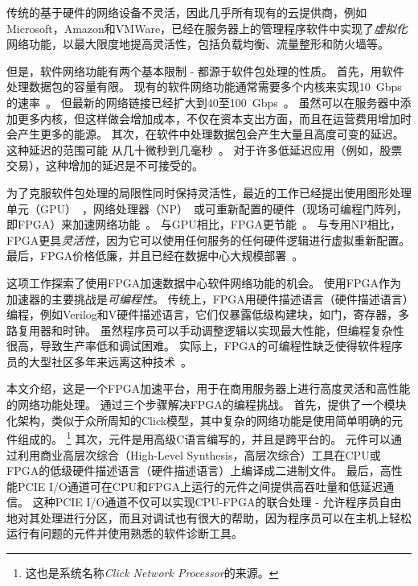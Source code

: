 传统的基于硬件的网络设备不灵活，因此几乎所有现有的云提供商，例如Microsoft，Amazon和VMWare，已经在服务器上的管理程序软件中实现了\textit{虚拟化}网络功能，以最大限度地提高灵活性，包括负载均衡、流量整形和防火墙等。

但是，软件网络功能有两个基本限制 - 都源于软件包处理的性质。
首先，用软件处理数据包的容量有限。
现有的软件网络功能通常需要多个内核来实现10~Gbps的速率~\cite{comb,martins2014clickos}。
但最新的网络链接已经扩大到40至100~Gbps~\cite{mellanox-100g}。
虽然可以在服务器中添加更多内核，但这样做会增加成本，不仅在资本支出方面，而且在运营费用增加时会产生更多的能源。
%
其次，在软件中处理数据包会产生大量且高度可变的延迟。 这种延迟的范围可能
从几十微秒到几毫秒~\cite{martins2014clickos,ananta,duet}。
对于许多低延迟应用（例如，股票交易），这种增加的延迟是不可接受的。

为了克服软件包处理的局限性同时保持灵活性，最近的工作已经提出使用图形处理单元（GPU）~\cite{packetshader}，网络处理器（NP）~\cite {cavium,netronome}或可重新配置的硬件（现场可编程门阵列，即FPGA）来加速网络功能~\cite{netfpga,smartnic,rubow2010chimpp}。
与GPU相比，FPGA更节能~\cite {fpga-vs-gpu,fpga-vs-gpu2}。
与专用NP相比，FPGA更具\emph{灵活性}，因为它可以使用任何服务的任何硬件逻辑进行虚拟重新配置。
最后，FPGA价格低廉，并且已经在数据中心大规模部署~\cite {smartnic,putnam2014reconfigurable}。

这项工作探索了使用FPGA加速数据中心软件网络功能的机会。
使用FPGA作为加速器的主要挑战是\textit{可编程性}。
传统上，FPGA用硬件描述语言（硬件描述语言）编程，例如Verilog和V硬件描述语言，它们仅暴露低级构建块，如门，寄存器，多路复用器和时钟。
虽然程序员可以手动调整逻辑以实现最大性能，但编程复杂性很高，导致生产率低和调试困难。
实际上，FPGA的可编程性缺乏使得软件程序员的大型社区多年来远离这种技术~\cite{bacon2013fpga}。

本文介绍\name{}，这是一个FPGA加速平台，用于在商用服务器上进行高度灵活和高性能的网络功能处理。
\name{}通过三个步骤解决FPGA的编程挑战。
首先，提供了一个模块化架构，类似于众所周知的Click模型\cite {kohler2000click}，其中复杂的网络功能是使用简单明确的元件组成的。
\footnote{这也是系统名称\textit{Click Network Processor}的来源。}
其次，\name 元件是用高级C语言编写的，并且是跨平台的。
\name 元件可以通过利用商业高层次综合（High-Level Synthesis，高层次综合）工具\cite {vivado,aoc,sdaccel}在CPU或FPGA的低级硬件描述语言（硬件描述语言）上编译成二进制文件。
最后，高性能PCIE I/O通道可在CPU和FPGA上运行的元件之间提供高吞吐量和低延迟通信。
这种PCIE I/O通道不仅可以实现CPU-FPGA的联合处理 - 允许程序员自由地对其处理进行分区，而且对调试也有很大的帮助，因为程序员可以在主机上轻松运行有问题的元件并使用熟悉的软件诊断工具。

